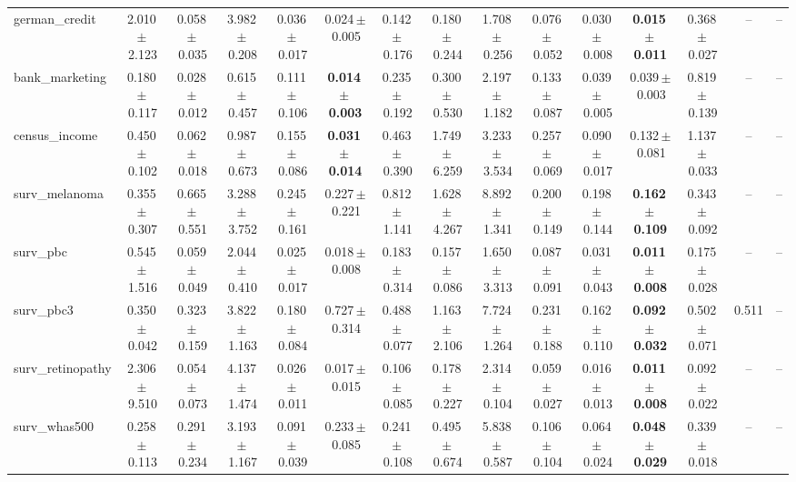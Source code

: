 \documentclass[8pt]{extarticle}
\begin{document}
\begin{longtable}{l*{14}{c}}
german\_credit & 2.010\,$\pm$\,2.123 & 0.058\,$\pm$\,0.035 & 3.982\,$\pm$\,0.208 & 0.036\,$\pm$\,0.017 & 0.024\,$\pm$\,0.005 & 0.142\,$\pm$\,0.176 & 0.180\,$\pm$\,0.244 & 1.708\,$\pm$\,0.256 & 0.076\,$\pm$\,0.052 & 0.030\,$\pm$\,0.008 & \textbf{0.015\,$\pm$\,0.011} & 0.368\,$\pm$\,0.027 & -- & -- \\
bank\_marketing & 0.180\,$\pm$\,0.117 & 0.028\,$\pm$\,0.012 & 0.615\,$\pm$\,0.457 & 0.111\,$\pm$\,0.106 & \textbf{0.014\,$\pm$\,0.003} & 0.235\,$\pm$\,0.192 & 0.300\,$\pm$\,0.530 & 2.197\,$\pm$\,1.182 & 0.133\,$\pm$\,0.087 & 0.039\,$\pm$\,0.005 & 0.039\,$\pm$\,0.003 & 0.819\,$\pm$\,0.139 & -- & -- \\
census\_income & 0.450\,$\pm$\,0.102 & 0.062\,$\pm$\,0.018 & 0.987\,$\pm$\,0.673 & 0.155\,$\pm$\,0.086 & \textbf{0.031\,$\pm$\,0.014} & 0.463\,$\pm$\,0.390 & 1.749\,$\pm$\,6.259 & 3.233\,$\pm$\,3.534 & 0.257\,$\pm$\,0.069 & 0.090\,$\pm$\,0.017 & 0.132\,$\pm$\,0.081 & 1.137\,$\pm$\,0.033 & -- & -- \\
surv\_melanoma & 0.355\,$\pm$\,0.307 & 0.665\,$\pm$\,0.551 & 3.288\,$\pm$\,3.752 & 0.245\,$\pm$\,0.161 & 0.227\,$\pm$\,0.221 & 0.812\,$\pm$\,1.141 & 1.628\,$\pm$\,4.267 & 8.892\,$\pm$\,1.341 & 0.200\,$\pm$\,0.149 & 0.198\,$\pm$\,0.144 & \textbf{0.162\,$\pm$\,0.109} & 0.343\,$\pm$\,0.092 & -- & -- \\
surv\_pbc & 0.545\,$\pm$\,1.516 & 0.059\,$\pm$\,0.049 & 2.044\,$\pm$\,0.410 & 0.025\,$\pm$\,0.017 & 0.018\,$\pm$\,0.008 & 0.183\,$\pm$\,0.314 & 0.157\,$\pm$\,0.086 & 1.650\,$\pm$\,3.313 & 0.087\,$\pm$\,0.091 & 0.031\,$\pm$\,0.043 & \textbf{0.011\,$\pm$\,0.008} & 0.175\,$\pm$\,0.028 & -- & -- \\
surv\_pbc3 & 0.350\,$\pm$\,0.042 & 0.323\,$\pm$\,0.159 & 3.822\,$\pm$\,1.163 & 0.180\,$\pm$\,0.084 & 0.727\,$\pm$\,0.314 & 0.488\,$\pm$\,0.077 & 1.163\,$\pm$\,2.106 & 7.724\,$\pm$\,1.264 & 0.231\,$\pm$\,0.188 & 0.162\,$\pm$\,0.110 & \textbf{0.092\,$\pm$\,0.032} & 0.502\,$\pm$\,0.071 & 0.511 & -- \\
surv\_retinopathy & 2.306\,$\pm$\,9.510 & 0.054\,$\pm$\,0.073 & 4.137\,$\pm$\,1.474 & 0.026\,$\pm$\,0.011 & 0.017\,$\pm$\,0.015 & 0.106\,$\pm$\,0.085 & 0.178\,$\pm$\,0.227 & 2.314\,$\pm$\,0.104 & 0.059\,$\pm$\,0.027 & 0.016\,$\pm$\,0.013 & \textbf{0.011\,$\pm$\,0.008} & 0.092\,$\pm$\,0.022 & -- & -- \\
surv\_whas500 & 0.258\,$\pm$\,0.113 & 0.291\,$\pm$\,0.234 & 3.193\,$\pm$\,1.167 & 0.091\,$\pm$\,0.039 & 0.233\,$\pm$\,0.085 & 0.241\,$\pm$\,0.108 & 0.495\,$\pm$\,0.674 & 5.838\,$\pm$\,0.587 & 0.106\,$\pm$\,0.104 & 0.064\,$\pm$\,0.024 & \textbf{0.048\,$\pm$\,0.029} & 0.339\,$\pm$\,0.018 & -- & -- \\

\end{longtable}
\end{document}
